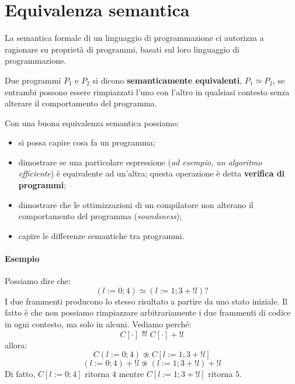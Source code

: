 \chapter{Equivalenza semantica}
La semantica formale di un linguaggio di programmazione ci autorizza 
a ragionare su proprietà di programmi, basati sul loro linguaggio di 
programmazione.
\begin{tcolorbox}[title= Intuizione]
    Due programmi $P_1$ e $P_2$ si dicono \textbf{semanticamente
    equivalenti}, $P_1 \simeq P_2$, se entrambi possono essere
    rimpiazzati l'uno con l'altro in qualsiasi contesto senza
    alterare il comportamento del programma.
\end{tcolorbox}
Con una buona equivalenza semantica possiamo:
\begin{itemize}
    \item si possa capire cosa fa un programma;
    \item dimostrare se una particolare espressione (\textit{ad esempio,
    un algoritmo efficiente}) è equivalente ad un'altra; questa operazione 
    è detta \textbf{verifica di programmi};
    \item dimostrare che le ottimizzazioni di un compilatore
    non alterano il comportamento del programma (\textit{soundsness});
    \item capire le differenze semantiche tra programmi.
\end{itemize}
\subsubsection{Esempio}
Possiamo dire che:
\[
  (l:=0;4) \simeq (l:=1; 3+!l) ?
\]
I due frammenti producono lo stesso risultato a partire da uno stato iniziale.
Il fatto è che non possiamo rimpiazzare arbitrariamente 
i due frammenti di codice in ogni contesto, ma solo in alcuni. 
Vediamo perché:
\[
    C[\cdot] \eqdef C[\cdot] + !l
\]
allora:
\[
    C(l:=0;4) \not\simeq C[l:=1; 3+!l]
\]
\[
    (l:=0;4) + !l \not\simeq (l:=1; 3+!l) + !l
\]
Di fatto, $C[l:=0;4]$ ritorna $4$ mentre $C[l:=1; 3+!l]$ ritorna $5$.
